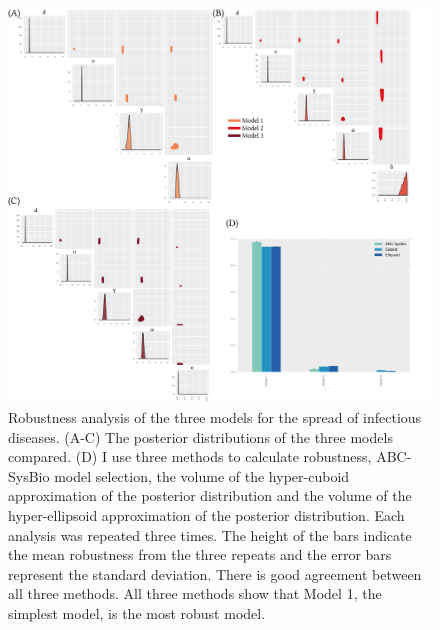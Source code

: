 \begin{figure}[p]
\begin{center}
\includegraphics[width=\textwidth]{../../chapters/chapterStabilityFinder/images/ex1_sum.png}
\caption[Robustness analysis of case study 1]{\label{fig:rob_sysbio1} Robustness analysis of the three models for the spread of infectious diseases. (A-C) The posterior distributions of the three models compared. (D) I use three methods to calculate robustness, ABC-SysBio model selection, the volume of the hyper-cuboid approximation of the posterior distribution and the volume of the hyper-ellipsoid approximation of the posterior distribution. Each analysis was repeated three times. The height of the bars indicate the mean robustness from the three repeats and the error bars represent the standard deviation. There is good agreement between all three methods. All three methods show that Model 1, the simplest model, is the most robust model. }

\end{center}
\end{figure}

